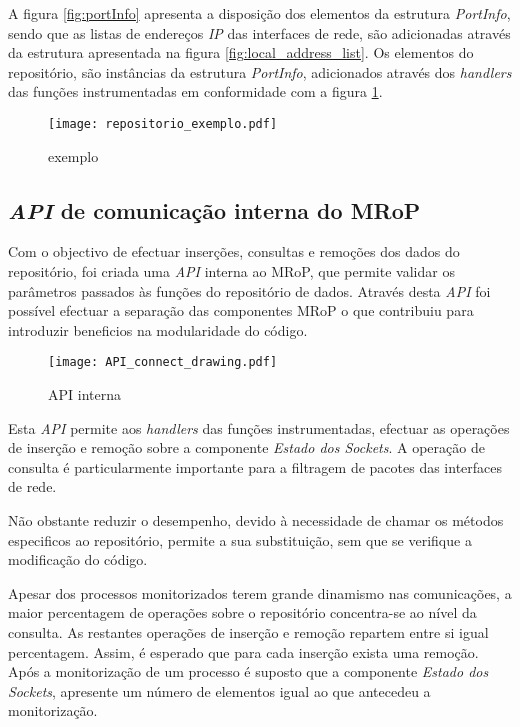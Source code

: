 A figura \ref{fig:portInfo} apresenta a disposição dos elementos da estrutura \textit{PortInfo}, sendo que as listas de endereços \textit{IP} das interfaces de rede, são adicionadas através da estrutura apresentada na figura \ref{fig:local_address_list}.
Os elementos do repositório, são instâncias da estrutura \textit{PortInfo}, adicionados através dos \textit{handlers} das funções instrumentadas em conformidade com a figura \ref{fig:repo_example}.

\begin{figure}[ht]
\centering
\texttt{[image: repositorio\_exemplo.pdf]}
\caption{exemplo}
\label{fig:repo_example}
\end{figure}

\subsection{\textit{API} de comunicação interna do MRoP}
\label{sub:repo_api}

Com o objectivo de efectuar inserções, consultas e remoções dos dados do repositório, foi criada uma \textit{API} interna ao MRoP, que permite validar os parâmetros passados às funções do repositório de dados.
Através desta \textit{API} foi possível efectuar a separação das componentes MRoP o que contribuiu para introduzir beneficios na modularidade do código.

\begin{figure}[ht]
\centering
\texttt{[image: API\_connect\_drawing.pdf]}
\caption{API interna}
\label{fig:api_connect}
\end{figure}

Esta \textit{API} permite aos \textit{handlers} das funções instrumentadas, efectuar as operações de inserção e remoção sobre a componente \textit{Estado dos Sockets}.
A operação de consulta é particularmente importante para a filtragem de pacotes das interfaces de rede.

Não obstante reduzir o desempenho, devido à necessidade de chamar os métodos especificos ao repositório, permite a sua substituição, sem que se verifique a modificação do código.

Apesar dos processos monitorizados terem grande dinamismo nas comunicações, a maior percentagem de operações sobre o repositório concentra-se ao nível da consulta.
As restantes operações de inserção e remoção repartem entre si igual percentagem.
Assim, é esperado que para cada inserção exista uma remoção.
Após a monitorização de um processo é suposto que a componente \textit{Estado dos Sockets}, apresente um número de elementos igual ao que antecedeu a monitorização.

